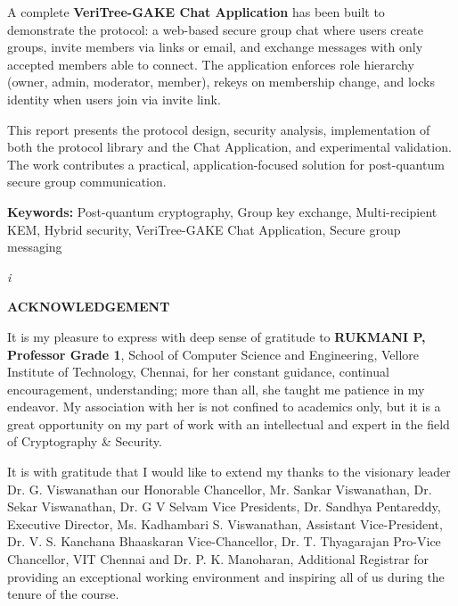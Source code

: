 \documentclass[12pt,a4paper]{report}
\begin{document}
A complete \textbf{VeriTree-GAKE Chat Application} has been built to demonstrate the protocol: a web-based secure group chat where users create groups, invite members via links or email, and exchange messages with only accepted members able to connect. The application enforces role hierarchy (owner, admin, moderator, member), rekeys on membership change, and locks identity when users join via invite link.

This report presents the protocol design, security analysis, implementation of both the protocol library and the Chat Application, and experimental validation. The work contributes a practical, application-focused solution for post-quantum secure group communication.

\vspace{0.5cm}

\noindent\textbf{Keywords:} Post-quantum cryptography, Group key exchange, Multi-recipient KEM, Hybrid security, VeriTree-GAKE Chat Application, Secure group messaging

\vspace{0.5cm}

\begin{center}
\textit{i}
\end{center}

\newpage
\thispagestyle{empty}

\begin{center}
{\fontsize{14}{17}\bfseries ACKNOWLEDGEMENT}
\end{center}

\vspace{0.5cm}

It is my pleasure to express with deep sense of gratitude to \textbf{RUKMANI P, Professor Grade 1}, School of Computer Science and Engineering, Vellore Institute of
Technology, Chennai, for her constant guidance, continual encouragement,
understanding; more than all, she taught me patience in my endeavor. My
association with her is not confined to academics only, but it is a great
opportunity on my part of work with an intellectual and expert in the field of
Cryptography & Security.

It is with gratitude that I would like to extend my thanks to the visionary leader Dr. G. Viswanathan our Honorable Chancellor, Mr. Sankar Viswanathan, Dr. Sekar Viswanathan, Dr. G V Selvam Vice Presidents, Dr. Sandhya Pentareddy, Executive Director, Ms. Kadhambari S. Viswanathan, Assistant Vice-President, Dr. V. S. Kanchana Bhaaskaran Vice-Chancellor, Dr. T. Thyagarajan Pro-Vice Chancellor, VIT Chennai and Dr. P. K. Manoharan, Additional Registrar for providing an exceptional working environment and inspiring all of us during the tenure of the course.
\end{document}
